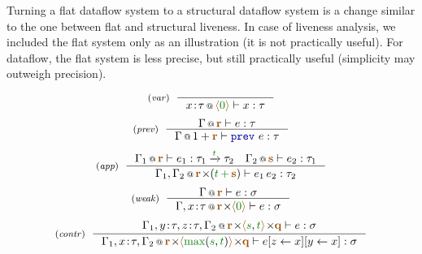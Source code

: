 Turning a flat dataflow system to a structural dataflow system is a change similar to the one
between flat and structural liveness. In case of liveness analysis, we included the flat system
only as an illustration (it is not practically useful). For dataflow, the flat system is less
precise, but still practically useful (simplicity may outweigh precision).


\begin{figure}[t]
\begin{equation*}
\tyrule{var}{}
  {\coctx{x \!:\! \tau}{\alift{\cclrd{0}}} \vdash x : \tau}
\end{equation*}
\begin{equation*}
\tyrule{prev}
  {\coctx{\Gamma}{\aclrd{\textbf{r}}} \vdash e : \tau}
  {\coctx{\Gamma}{1 + \aclrd{\textbf{r}}} \vdash \kvd{prev}~e : \tau}
\end{equation*}
\begin{equation*}
\tyrule{app}
  { \coctx{\Gamma_1}{\aclrd{\textbf{r}}} \vdash e_1 : \tau_1 \xrightarrow{\cclrd{t}} \tau_2 \quad
    \coctx{\Gamma_2}{\aclrd{\textbf{s}}} \vdash e_2 : \tau_1}
  { \coctx{\Gamma_1, \Gamma_2}{\aclrd{\textbf{r}} \cons (\cclrd{t} \,\cclrd{+}\, \aclrd{\textbf{s}})} \vdash e_1 \, e_2 : \tau_2}
\end{equation*}
\begin{equation*}
\tyrule{weak}
  {\coctx{\Gamma}{ \aclrd{\textbf{r}} } \vdash e : \sigma}
  {\coctx{\Gamma,x \!:\! \tau}{\aclrd{\textbf{r}} \cons \alift{ \cclrd{0} }} \vdash e : \sigma}
\end{equation*}
\begin{equation*}
\tyrule{contr}
  {\coctx{\Gamma_1,y\!:\!\tau,z\!:\!\tau,\Gamma_2}{\aclrd{\textbf{r}} \cons \alift{\cclrd{s},\cclrd{t}} \cons \aclrd{\textbf{q}}} \vdash e : \sigma}
  {\coctx{\Gamma_1,x\!:\!\tau,\Gamma_2}{\aclrd{\textbf{r}} \cons \alift{\cclrd{\textnormal{max}}(\cclrd{s},\cclrd{t})} \cons \aclrd{\textbf{q}}} \vdash \subst{\subst{e}{z}{x}}{y}{x} : \sigma}
\end{equation*}

\label{fig:applications-struct-df}
\vspace{-1em}
\end{figure}


